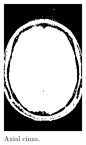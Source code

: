 \documentclass{article}
\begin{document}
\begin{figure}[h]
\begin{subfigure}[b]{0.3\textwidth}
        \includegraphics[width=\textwidth]{brain/radiologist-axial-gray.png}
        \caption{Axial cinza.}
    \end{subfigure}
    ~
    \begin{subfigure}[b]{0.3\textwidth}

\end{subfigure}
\end{figure}
\end{document}
